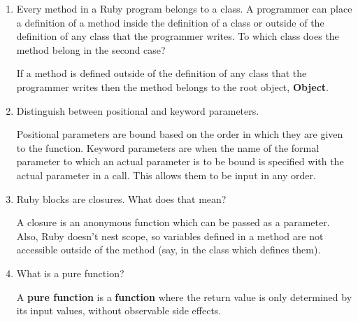 \begin{enumerate}
\begin{answer}
  \end{answer}

  \item Every method in a Ruby program belongs to a class.
    A programmer can place a definition of a method inside
    the definition of a class or outside of the definition
    of any class that the programmer writes. To which class
    does the method belong in the second case?

  \begin{answer}

  	If a method is defined outside of the definition of any class that the programmer writes then the method belongs to the root object, \textbf{Object}.

  \end{answer}

  \item Distinguish between positional and keyword parameters.

  \begin{answer}

  	Positional parameters are bound based on the order in which they are given to the function. Keyword parameters are when the name of the formal parameter to which an actual parameter is to be bound is specified with the actual parameter in a call. This allows them to be input in any order.

  \end{answer}

  \item Ruby blocks are closures. What does that mean?

  \begin{answer}

    A closure is an anonymous function which can be passed as a parameter. Also, Ruby doesn't nest scope, so variables defined in a method are not accessible outside of the method (say, in the class which defines them).

  \end{answer}

  \item What is a pure function?

  \begin{answer}

  	A \textbf{pure function} is a \textbf{function} where the return value is only determined by its input values, without observable side effects.

  \end{answer}


\end{enumerate}
